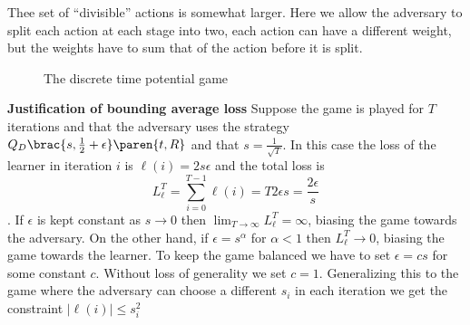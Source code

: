 \documentclass{article}[12pt]
\begin{document}
Thee set of ``divisible'' actions is somewhat larger. Here we allow
the adversary to split each action at each stage into two, each action
can have a different weight, but the weights have to sum that of the
action before it is split.

\begin{figure}[ht!]
\caption{The discrete time potential game  \label{fig:discrete-Time-Game}}
\end{figure}


{\bf Justification of bounding average loss} Suppose the game is
played for $T$ iterations and that the adversary uses the strategy
$\adversMd\brac{s,\frac{1}{2}+\epsilon}\paren{t,\R}$ and that
$s=\frac{1}{\sqrt{T}}$. In this case the loss of the learner in
iteration $i$ is $\ell(i)=2s\epsilon$ and the total loss is
$$L_\ell^T=\sum_{i=0}^{T-1} \ell(i) = T 2 \epsilon s = \frac{2 \epsilon}{s}$$.
If $\epsilon$ is kept constant as $s \to 0$ then
$\lim_{T \to \infty}L_\ell^T=\infty$, biasing the game towards the
adversary. On the other hand, if $\epsilon =s^{\alpha}$ for $\alpha<1$
then $L_\ell^T \to 0$, biasing the game towards the learner. To keep
the game balanced we have to set $\epsilon=cs$ for some constant
$c$. Without loss of generality we set $c=1$.
Generalizing this to the game where the adversary can choose a
different $s_i$ in each iteration we get the constraint
$|\ell(i)| \leq s_i^2$
\end{document}
